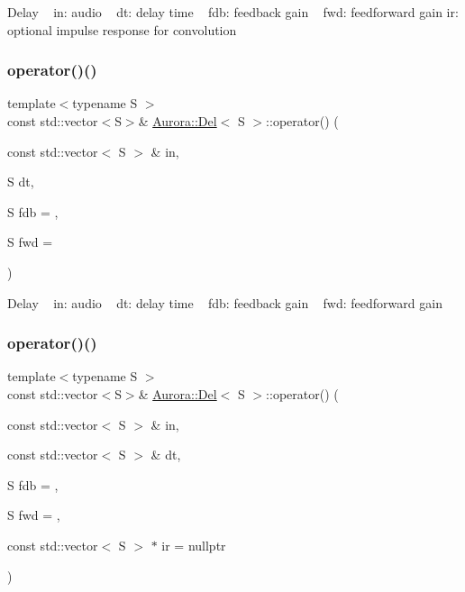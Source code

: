 Delay ~\newline
in\+: audio ~\newline
dt\+: delay time ~\newline
fdb\+: feedback gain ~\newline
fwd\+: feedforward gain ir\+: optional impulse response for convolution \mbox{\label{class_aurora_1_1_del_a7061e3fc28fa7c9cace2f194c0c2933b}} 
\subsubsection{\texorpdfstring{operator()()}{operator()()}\hspace{0.1cm}{\footnotesize\ttfamily [2/4]}}
{\footnotesize\ttfamily template$<$typename S $>$ \\
const std\+::vector$<$S$>$\& \hyperlink{class_aurora_1_1_del}{Aurora\+::\+Del}$<$ S $>$\+::operator() (\begin{DoxyParamCaption}\item[{const std\+::vector$<$ S $>$ \&}]{in,  }\item[{S}]{dt,  }\item[{S}]{fdb = {},  }\item[{S}]{fwd = {} }\end{DoxyParamCaption})\hspace{0.3cm}{\ttfamily [inline]}}

Delay ~\newline
in\+: audio ~\newline
dt\+: delay time ~\newline
fdb\+: feedback gain ~\newline
fwd\+: feedforward gain \mbox{\label{class_aurora_1_1_del_a565d7b65191120a0251e83833bb62ea4}} 
\subsubsection{\texorpdfstring{operator()()}{operator()()}\hspace{0.1cm}{\footnotesize\ttfamily [3/4]}}
{\footnotesize\ttfamily template$<$typename S $>$ \\
const std\+::vector$<$S$>$\& \hyperlink{class_aurora_1_1_del}{Aurora\+::\+Del}$<$ S $>$\+::operator() (\begin{DoxyParamCaption}\item[{const std\+::vector$<$ S $>$ \&}]{in,  }\item[{const std\+::vector$<$ S $>$ \&}]{dt,  }\item[{S}]{fdb = {},  }\item[{S}]{fwd = {},  }\item[{const std\+::vector$<$ S $>$ $\ast$}]{ir = {\ttfamily nullptr} }\end{DoxyParamCaption})\hspace{0.3cm}{\ttfamily [inline]}}

